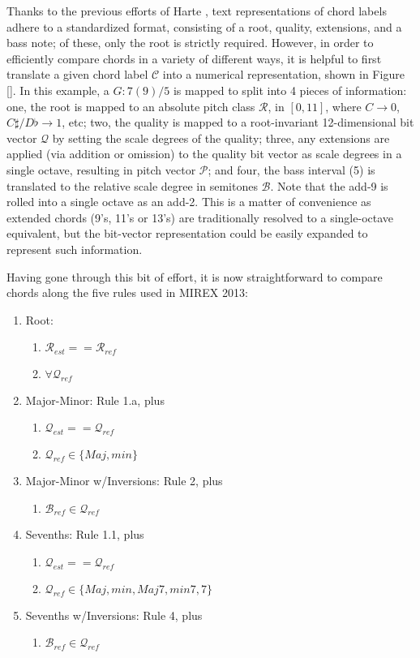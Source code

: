 \documentclass{article}
\begin{document}
Thanks to the previous efforts of Harte \cite{}, text representations of chord labels adhere to a standardized format, consisting of a root, quality, extensions, and a bass note; of these, only the root is strictly required.
However, in order to efficiently compare chords in a variety of different ways, it is helpful to first translate a given chord label $\mathcal{C}$ into a numerical representation, shown in Figure \ref{}.
In this example, a $G:7(9)/5$ is mapped to split into 4 pieces of information: one, the root is mapped to an absolute pitch class $\mathcal{R}$, in $[0, 11]$, where $C\to0$, $C\sharp/D\flat\to1$, etc; two, the quality is mapped to a root-invariant 12-dimensional bit vector $\mathcal{Q}$ by setting the scale degrees of the quality; three, any extensions are applied (via addition or omission) to the quality bit vector as scale degrees in a single octave, resulting in pitch vector $\mathcal{P}$; and four, the bass interval (5) is translated to the relative scale degree in semitones $\mathcal{B}$.
Note that the add-9 is rolled into a single octave as an add-2.
This is a matter of convenience as extended chords (9's, 11's or 13's) are traditionally resolved to a single-octave equivalent, but the bit-vector representation could be easily expanded to represent such information.

Having gone through this bit of effort, it is now straightforward to compare chords along the five rules used in MIREX 2013:
\begin{enumerate}
\item Root:
	\begin{enumerate}
	\item $\mathcal{R}_{est} == \mathcal{R}_{ref}$
	\item $\forall \mathcal{Q}_{ref}$
	\end{enumerate}
\item Major-Minor: Rule 1.a, plus
	\begin{enumerate}
	\item $\mathcal{Q}_{est} == \mathcal{Q}_{ref}$
	\item $\mathcal{Q}_{ref} \in \{Maj, min\}$ 
	\end{enumerate}
\item Major-Minor w/Inversions: Rule 2, plus
	\begin{enumerate}
	\item $\mathcal{B}_{ref} \in \mathcal{Q}_{ref}$
	\end{enumerate}
\item Sevenths: Rule 1.1, plus
	\begin{enumerate}
	\item $\mathcal{Q}_{est} == \mathcal{Q}_{ref} $
	\item $ \mathcal{Q}_{ref} \in \{Maj, min, Maj7, min7, 7\}$ 
	\end{enumerate}
\item Sevenths w/Inversions: Rule 4, plus
	\begin{enumerate}
	\item $\mathcal{B}_{ref} \in \mathcal{Q}_{ref}$ 
	\end{enumerate}
\end{enumerate}
\end{document}
